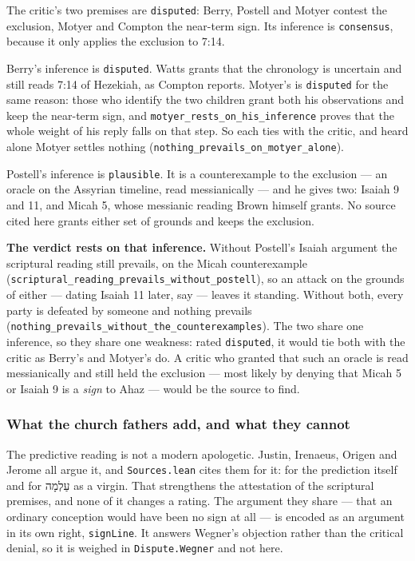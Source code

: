 \documentclass[11pt]{article}
\begin{document}
The critic's two premises are \texttt{disputed}: Berry, Postell and Motyer contest the exclusion, Motyer and Compton the near-term sign. Its inference is \texttt{consensus}, because it only applies the exclusion to 7:14.

Berry's inference is \texttt{disputed}. Watts grants that the chronology is uncertain and still reads 7:14 of Hezekiah, as Compton reports. Motyer's is \texttt{disputed} for the same reason: those who identify the two children grant both his observations and keep the near-term sign, and \texttt{motyer\_\allowbreak{}rests\_\allowbreak{}on\_\allowbreak{}his\_\allowbreak{}inference} proves that the whole weight of his reply falls on that step. So each ties with the critic, and heard alone Motyer settles nothing (\texttt{nothing\_\allowbreak{}prevails\_\allowbreak{}on\_\allowbreak{}motyer\_\allowbreak{}alone}).

Postell's inference is \texttt{plausible}. It is a counterexample to the exclusion — an oracle on the Assyrian timeline, read messianically — and he gives two: Isaiah 9 and 11, and Micah 5, whose messianic reading Brown himself grants. No source cited here grants either set of grounds and keeps the exclusion.

\textbf{The verdict rests on that inference.} Without Postell's Isaiah argument the scriptural reading still prevails, on the Micah counterexample (\texttt{scriptural\_\allowbreak{}reading\_\allowbreak{}prevails\_\allowbreak{}without\_\allowbreak{}postell}), so an attack on the grounds of either — dating Isaiah 11 later, say — leaves it standing. Without both, every party is defeated by someone and nothing prevails (\texttt{nothing\_\allowbreak{}prevails\_\allowbreak{}without\_\allowbreak{}the\_\allowbreak{}counterexamples}). The two share one inference, so they share one weakness: rated \texttt{disputed}, it would tie both with the critic as Berry's and Motyer's do. A critic who granted that such an oracle is read messianically and still held the exclusion — most likely by denying that Micah 5 or Isaiah 9 is a \emph{sign} to Ahaz — would be the source to find.

\subsubsection*{What the church fathers add, and what they cannot}
The predictive reading is not a modern apologetic. Justin, Irenaeus, Origen and Jerome all argue it, and \texttt{Sources.lean} cites them for it: for the prediction itself and for עַלְמָה as a virgin. That strengthens the attestation of the scriptural premises, and none of it changes a rating. The argument they share — that an ordinary conception would have been no sign at all — is encoded as an argument in its own right, \texttt{sign\allowbreak{}Line}. It answers Wegner's objection rather than the critical denial, so it is weighed in \texttt{Dispute.Wegner} and not here.
\end{document}
